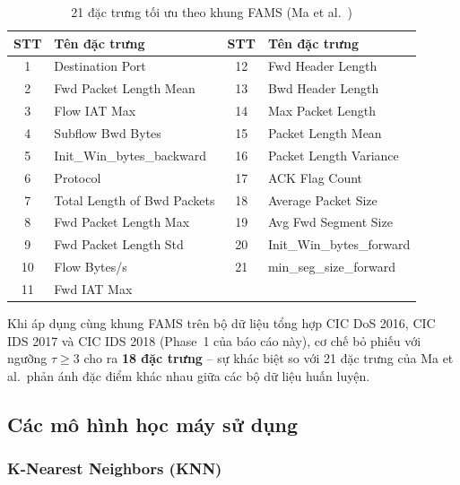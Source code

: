 \begin{table}[htbp]
\caption{21 đặc trưng tối ưu theo khung FAMS (Ma et al.~\cite{ma2023fams})}
\begin{center}
\begin{small}
\begin{tabular}{|c|l|c|l|}
\hline
\textbf{STT} & \textbf{Tên đặc trưng} & \textbf{STT} & \textbf{Tên đặc trưng} \\
\hline
1  & Destination Port          & 12 & Fwd Header Length \\
2  & Fwd Packet Length Mean    & 13 & Bwd Header Length \\
3  & Flow IAT Max              & 14 & Max Packet Length \\
4  & Subflow Bwd Bytes         & 15 & Packet Length Mean \\
5  & Init\_Win\_bytes\_backward & 16 & Packet Length Variance \\
6  & Protocol                  & 17 & ACK Flag Count \\
7  & Total Length of Bwd Packets & 18 & Average Packet Size \\
8  & Fwd Packet Length Max     & 19 & Avg Fwd Segment Size \\
9  & Fwd Packet Length Std     & 20 & Init\_Win\_bytes\_forward \\
10 & Flow Bytes/s              & 21 & min\_seg\_size\_forward \\
11 & Fwd IAT Max               &    & \\
\hline
\end{tabular}
\end{small}
\label{tab:ma_fams_features}
\end{center}
\end{table}

Khi áp dụng cùng khung FAMS trên bộ dữ liệu tổng hợp CIC DoS 2016, CIC IDS 2017 và CIC IDS 2018 (Phase~1 của báo cáo này), cơ chế bỏ phiếu với ngưỡng $\tau \geq 3$ cho ra \textbf{18 đặc trưng} -- sự khác biệt so với 21 đặc trưng của Ma et al.\ phản ánh đặc điểm khác nhau giữa các bộ dữ liệu huấn luyện.

\subsection{Các mô hình học máy sử dụng}

\subsubsection{K-Nearest Neighbors (KNN)}

